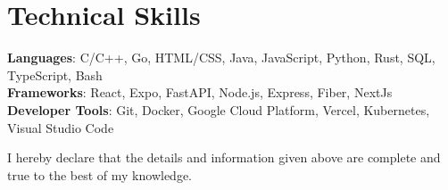 \documentclass[letterpaper,11pt]{article}
\begin{document}
\section{Technical Skills}
 \begin{itemize}[leftmargin=0.15in, label={}]
    \small{\item{
     \textbf{Languages}{: C/C++, Go, HTML/CSS, Java, JavaScript, Python, Rust, SQL, TypeScript, Bash} \\
     \textbf{Frameworks}{: React, Expo, FastAPI, Node.js, Express, Fiber, NextJs} \\
     \textbf{Developer Tools}{: Git, Docker, Google Cloud Platform, Vercel, Kubernetes, Visual Studio Code} \\

    }}
 \end{itemize}

\vspace{2em}
\begin{center}
    \small I hereby declare that the details and information given above are complete and true to the best of my knowledge.
\end{center}
\end{document}
